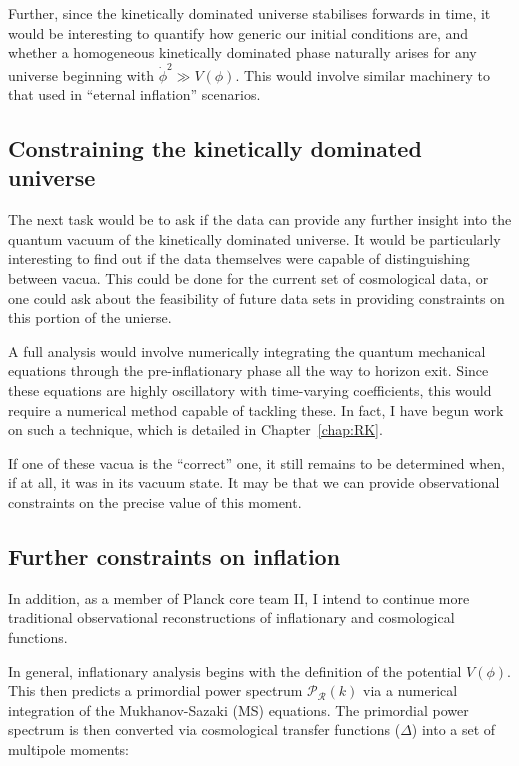 Further, since the kinetically dominated universe stabilises forwards in time, it would be interesting to quantify how generic our initial conditions are, and whether a homogeneous kinetically dominated phase naturally arises for any universe beginning with \(\dot{\phi}^2\gg V(\phi)\). This would involve similar machinery to that used in ``eternal inflation'' scenarios.


\subsection*{Constraining the kinetically dominated universe}

The next task would be to ask if the data can provide any further insight into the quantum vacuum of the kinetically dominated universe. It would be particularly interesting to find out if the data themselves were capable of distinguishing between vacua. This could be done for the current set of cosmological data, or one could ask about the feasibility of future data sets in providing constraints on this portion of the unierse.

A full analysis would involve numerically integrating the quantum mechanical equations through the pre-inflationary phase all the way to horizon exit. Since these equations are highly oscillatory with time-varying coefficients, this would require a numerical method capable of tackling these. In fact, I have begun work on such a technique, which is detailed in Chapter~\ref{chap:RK}.

If one of these vacua is the ``correct'' one, it still remains to be determined when, if at all, it was in its vacuum state. It may be that we can provide observational constraints on the precise value of this moment.

\subsection*{Further constraints on inflation}
In addition, as a member of Planck core team II, I intend to continue more traditional observational reconstructions of inflationary and cosmological functions.

In general, inflationary analysis begins with the definition of the potential \(V(\phi)\). This then predicts a primordial power spectrum \(\mathcal{P}_\mathcal{R}(k)\) via a numerical integration of the Mukhanov-Sazaki (MS) equations. The primordial power spectrum is then converted via cosmological transfer functions (\(\Delta\)) into a set of multipole moments:

